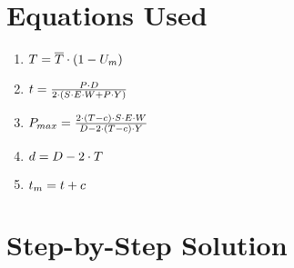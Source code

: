 \documentclass[11pt,a4paper]{article}
\begin{document}
\section{Equations Used}

\begin{enumerate}
\item $\Large T = \overline{T}  \cdot  (1  - U_m)$
\item $\Large t = \frac{P  \cdot  D}{2   \cdot  (S  \cdot  E  \cdot  W + P  \cdot  Y)}$
\item $\Large P_{max} = \frac{2   \cdot  (T - c)  \cdot  S  \cdot  E  \cdot  W}{D - 2   \cdot  (T - c)  \cdot  Y}$
\item $\Large d = D - 2   \cdot  T$
\item $\Large t_{m} = t + c$
\end{enumerate}

\section{Step-by-Step Solution}
\end{document}
